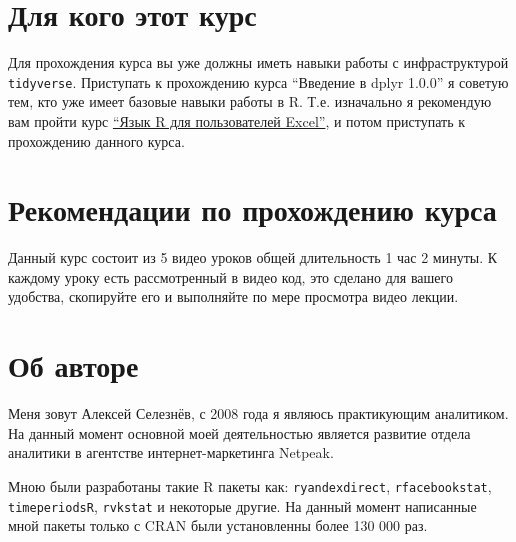 \documentclass[
]{book}
\begin{document}
\hypertarget{ux434ux43bux44f-ux43aux43eux433ux43e-ux44dux442ux43eux442-ux43aux443ux440ux441}{%
\section*{Для кого этот курс}\label{ux434ux43bux44f-ux43aux43eux433ux43e-ux44dux442ux43eux442-ux43aux443ux440ux441}}

Для прохождения курса вы уже должны иметь навыки работы с инфраструктурой \texttt{tidyverse}. Приступать к прохождению курса ``Введение в dplyr 1.0.0'' я советую тем, кто уже имеет базовые навыки работы в R. Т.е. изначально я рекомендую вам пройти курс \href{https://selesnow.github.io/r4excel_users/}{``Язык R для пользователей Excel''}, и потом приступать к прохождению данного курса.

\hypertarget{ux440ux435ux43aux43eux43cux435ux43dux434ux430ux446ux438ux438-ux43fux43e-ux43fux440ux43eux445ux43eux436ux434ux435ux43dux438ux44e-ux43aux443ux440ux441ux430}{%
\section*{Рекомендации по прохождению курса}\label{ux440ux435ux43aux43eux43cux435ux43dux434ux430ux446ux438ux438-ux43fux43e-ux43fux440ux43eux445ux43eux436ux434ux435ux43dux438ux44e-ux43aux443ux440ux441ux430}}

Данный курс состоит из 5 видео уроков общей длительность 1 час 2 минуты. К каждому уроку есть рассмотренный в видео код, это сделано для вашего удобства, скопируйте его и выполняйте по мере просмотра видео лекции.

\hypertarget{ux43eux431-ux430ux432ux442ux43eux440ux435}{%
\section*{Об авторе}\label{ux43eux431-ux430ux432ux442ux43eux440ux435}}

Меня зовут Алексей Селезнёв, с 2008 года я являюсь практикующим аналитиком. На данный момент основной моей деятельностью является развитие отдела аналитики в агентстве интернет-маркетинга Netpeak.

Мною были разработаны такие R пакеты как: \texttt{ryandexdirect}, \texttt{rfacebookstat}, \texttt{timeperiodsR}, \texttt{rvkstat} и некоторые другие. На данный момент написанные мной пакеты только с CRAN были установленны более 130 000 раз.
\end{document}
